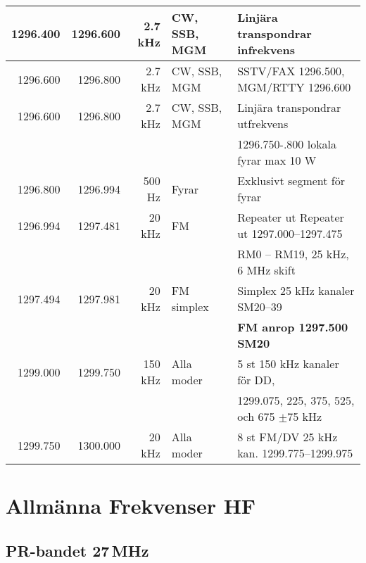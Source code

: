 \begin{tabular}{rrrll}
	         1296.400         & 1296.600      & 2.7 kHz     & CW, SSB, MGM    & Linjära transpondrar infrekvens                              \\ \hline
	         1296.600         & 1296.800      & 2.7 kHz     & CW, SSB, MGM    & SSTV/FAX 1296.500, MGM/RTTY 1296.600                         \\ \hline
	         1296.600         & 1296.800      & 2.7 kHz     & CW, SSB, MGM    & Linjära transpondrar utfrekvens                              \\
                                  &               &             &                 & 1296.750-.800 lokala fyrar max 10 W                          \\ \hline
	         1296.800         & 1296.994      & 500 Hz      & Fyrar           & Exklusivt segment för fyrar                                  \\ \hline
	         1296.994         & 1297.481      & 20 kHz      & FM              & Repeater ut Repeater ut 1297.000--1297.475                   \\
                                  &               &             &                 & RM0 – RM19, 25 kHz, 6 MHz skift                              \\ \hline
	         1297.494         & 1297.981      & 20 kHz      & FM simplex      & Simplex 25 kHz kanaler SM20--39                              \\
                                  &               &             &                 & \textbf{FM anrop 1297.500 SM20}                              \\ \hline
	         1299.000         & 1299.750      & 150 kHz     & Alla moder      & 5 st 150 kHz kanaler för DD,                                 \\
                                  &               &             &                 & 1299.075, 225, 375, 525, och 675 $\pm$75 kHz                 \\ \hline
	         1299.750         & 1300.000      & 20 kHz      & Alla moder      & 8 st FM/DV 25 kHz kan. 1299.775--1299.975
\end{tabular}
\normalsize

\section{Allmänna Frekvenser HF}

\subsection{PR-bandet 27\,MHz}


